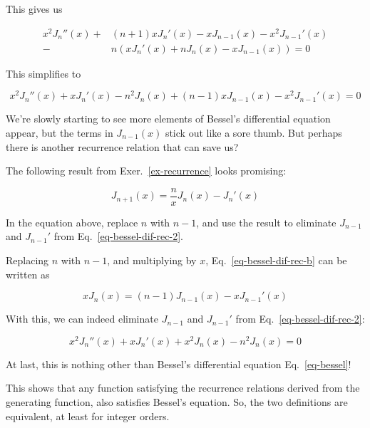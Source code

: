This gives us

\begin{align}
x^2 J_n''(x) +& (n + 1) x J_n'(x) - x J_{n-1}(x) - x^2 J_{n-1}'(x) \nonumber \\-& n\left(x J_n'(x) + n J_n(x) - x J_{n-1}(x)\right)= 0
\end{align} 

This simplifies to

\begin{equation}
x^2 J_n''(x) +  x J_n'(x) - n^2 J_n(x) + (n - 1) x J_{n-1}(x) - x^2 J_{n-1}'(x)  = 0 \label{eq-bessel-dif-rec-2}
\end{equation} 

We're slowly starting to see more elements of Bessel's differential equation appear, but the terms in $J_{n-1}(x)$ stick out like a sore thumb. But perhaps there is another recurrence relation that can save us?

The following result from Exer.~\ref{ex-recurrence} looks promising:

\begin{equation}
J_{n+1}(x) = \frac{n}{x}J_n(x) - J_n'(x) \label{eq-bessel-dif-rec-b}
\end{equation} 

\begin{cue}
In the equation above, replace $n$ with $n-1$, and use the result to eliminate $J_{n-1}$ and $J_{n-1}'$ from Eq.~\ref{eq-bessel-dif-rec-2}.
\end{cue}

Replacing $n$ with $n-1$, and multiplying by $x$, Eq.~\ref{eq-bessel-dif-rec-b} can be written as

\begin{equation}
x J_{n}(x) = (n-1)J_{n-1}(x) - x J_{n-1}'(x)
\end{equation} 

With this, we can indeed eliminate $J_{n-1}$ and $J_{n-1}'$ from Eq.~\ref{eq-bessel-dif-rec-2}:

\begin{equation}
x^2 J_n''(x) +  x J_n'(x) + x^2 J_n(x) - n^2 J_n(x) = 0
\end{equation} 

At last, this is nothing other than Bessel's differential equation Eq.~\ref{eq-bessel}!

This shows that any function satisfying the recurrence relations derived from the generating function, also satisfies Bessel's equation. So, the two definitions are equivalent, at least for integer orders.


